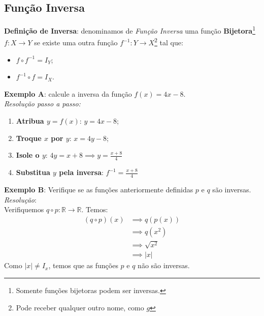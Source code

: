\documentclass[13pt,letterpaper]{article}
\begin{document}
\subsection{Função Inversa}
\textbf{Definição de Inversa}: denominamos de \emph{Função Inversa} uma função \textbf{Bijetora}\footnote{Somente funções bijetoras podem ser inversas.} $f: X \rightarrow Y$ se existe uma outra função $f^{-1}: Y \rightarrow X$\footnote{Pode receber qualquer outro nome, como $g$} tal que:
\begin{itemize}
    \item $f \circ f^{-1} = I_Y$;
    \item $f^{-1} \circ f = I_X$.
\end{itemize}
\textbf{Exemplo A}: calcule a inversa da função $f(x) = 4x - 8$. \\
\emph{Resolução passo a passo:}
\begin{enumerate}
    \item \textbf{Atribua $y = f(x)$}: $y = 4x - 8$;
    \item \textbf{Troque $x$ por $y$}: $x = 4y - 8$;
    \item \textbf{Isole o $y$}: $4y = x + 8 \implies y = \frac{x + 8}{4}$
    \item \textbf{Substitua $y$ pela inversa}: $f^{-1} = \frac{x + 8}{4}$
\end{enumerate}
\textbf{Exemplo B}: Verifique se as funções anteriormente definidas $p$ e $q$ são inversas.
\\
\emph{Resolução}: \\
Verifiquemos $q \circ p: \mathbb{R} \rightarrow \mathbb{R}$. Temos:
    \begin{align*}
        (q \circ p)(x) &\implies q(p(x)) \\
        &\implies q(x^2) \\
        &\implies \sqrt{x^2} \\
        &\implies |x|
    \end{align*}
Como $|x| \ne I_x$, temos que as funções $p$ e $q$ não são inversas.
\end{document}
